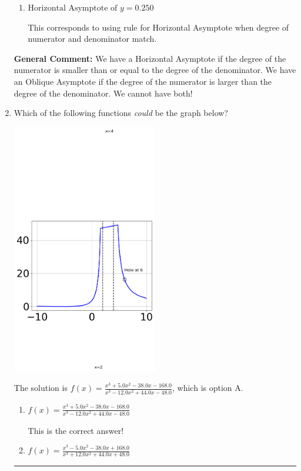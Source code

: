 \documentclass{extbook}[14pt]
\newcommand{\litem}[1]{\item #1

\rule{\textwidth}{0.4pt}}
\begin{document}
\begin{enumerate}
{\begin{enumerate}[label=\Alph*.]
This corresponds to flipping the numerator and denominator, then using synthetic division to find the oblique asymptote.
\item \( \text{Horizontal Asymptote of } y = 0.250  \)

This corresponds to using rule for Horizontal Asymptote when degree of numerator and denominator match.
\end{enumerate}

\textbf{General Comment:} We have a Horizontal Asymptote if the degree of the numerator is smaller than or equal to the degree of the denominator. We have an Oblique Asymptote if the degree of the numerator is larger than the degree of the denominator. We cannot have both!
}
\litem{
Which of the following functions \textit{could} be the graph below?

\begin{center}
    \includegraphics[width=0.5\textwidth]{../Figures/identifyGraphOfRationalFunctionA.png}
\end{center}


The solution is \( f(x)=\frac{x^{3} +5.0 x^{2} -38.0 x -168.0}{x^{3} -12.0 x^{2} +44.0 x -48.0} \), which is option A.\begin{enumerate}[label=\Alph*.]
\item \( f(x)=\frac{x^{3} +5.0 x^{2} -38.0 x -168.0}{x^{3} -12.0 x^{2} +44.0 x -48.0} \)

This is the correct answer!
\item \( f(x)=\frac{x^{3} -5.0 x^{2} -38.0 x + 168.0}{x^{3} +12.0 x^{2} +44.0 x + 48.0} \)


\end{enumerate}}
\end{enumerate}
\end{document}
